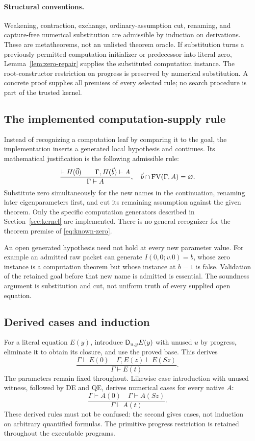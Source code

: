 \paragraph{Structural conventions.}
Weakening, contraction, exchange, ordinary-assumption cut, renaming, and
capture-free numerical substitution are admissible by induction on
derivations. These are metatheorems, not an unlisted theorem oracle.
If substitution turns a previously permitted computation initializer or
predecessor into literal zero, Lemma~\ref{lem:zero-repair} supplies the
substituted computation instance.
The root-constructor restriction on progress is preserved by numerical
substitution. A concrete proof supplies all premises of every selected
rule; no search procedure is part of the trusted kernel.

\subsection{The implemented computation-supply rule}

Instead of recognizing a computation leaf by comparing it to the goal,
the implementation inserts a generated local hypothesis and continues.
Its mathematical justification is the following admissible rule:
\begin{equation}
 \frac{\vdash H(\vec0)\qquad\Gamma,H(\vec b)\vdash A}
      {\Gamma\vdash A},
 \quad \vec b\cap\operatorname{FV}(\Gamma,A)=\varnothing.
 \label{eq:known-zero}
\end{equation}
Substitute zero simultaneously for the new names in the continuation,
renaming later eigenparameters first, and cut its remaining assumption
against the given theorem. Only the specific computation generators
described in Section~\ref{sec:kernel} are implemented. There is no general
recognizer for the theorem premise of \eqref{eq:known-zero}.

An open generated hypothesis need not hold at every new parameter value.
For example an admitted raw packet can generate
$I(0,0;v.0)=b$, whose zero instance is a computation theorem but whose
instance at $b=1$ is false. Validation of the retained goal before that
new name is admitted is essential. The soundness argument is substitution
and cut, not uniform truth of every supplied open equation.

\subsection{Derived cases and induction}

For a literal equation $E(y)$, introduce $\mathsf D_{u,y}E(y)$ with unused $u$
by progress, eliminate it to obtain its closure, and use the proved base.
This derives
\[
 \frac{\Gamma\vdash E(0)\quad\Gamma,E(z)\vdash E(Sz)}
      {\Gamma\vdash E(t)}.
\]
The parameters remain fixed throughout. Likewise case introduction with
unused witness, followed by DE and QE, derives numerical cases for every
native $A$:
\[
 \frac{\Gamma\vdash A(0)\quad\Gamma\vdash A(Sz)}
      {\Gamma\vdash A(t)}.
\]
These derived rules must not be confused: the second gives cases, not
induction on arbitrary quantified formulas. The primitive progress
restriction is retained throughout the executable programs.
